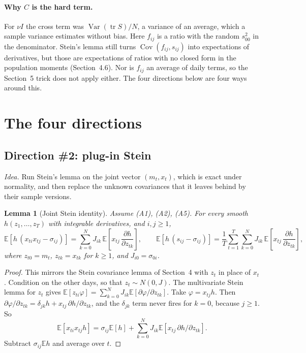 \documentclass[11pt]{article}
\newtheorem{lemma}{Lemma}
\theoremstyle{remark}
\begin{document}
\paragraph{Why $C$ is the hard term.}
For $\nu I$ the cross term was $\operatorname{Var}(\operatorname{tr}S)/N$, a variance of an average, which a sample variance estimates without bias. Here $f_{ij}$ is a ratio with the random $s_{00}^2$ in the denominator. Stein's lemma still turns $\operatorname{Cov}(f_{ij}, s_{ij})$ into expectations of derivatives, but those are expectations of ratios with no closed form in the population moments (Section~4.6). Nor is $f_{ij}$ an average of daily terms, so the Section~5 trick does not apply either. The four directions below are four ways around this.

\section{The four directions}

\subsection{Direction \#2: plug-in Stein}

\emph{Idea.} Run Stein's lemma on the joint vector $(m_t, x_t)$, which is exact under normality, and then replace the unknown covariances that it leaves behind by their sample versions.

\begin{lemma}[Joint Stein identity]\label{lem:joint-stein}
Assume (A1), (A2), (A5). For every smooth $h(z_1, \dots, z_T)$ with integrable derivatives, and $i, j \ge 1$,
\[
  \mathbb{E}\left[h\,(x_{ti}x_{tj} - \sigma_{ij})\right] = \sum_{k=0}^N J_{ik}\,\mathbb{E}\left[x_{tj}\,\frac{\partial h}{\partial z_{tk}}\right],
  \qquad
  \mathbb{E}\left[h\,(s_{ij} - \sigma_{ij})\right] = \frac{1}{T}\sum_{t=1}^T\sum_{k=0}^N J_{ik}\,\mathbb{E}\left[x_{tj}\,\frac{\partial h}{\partial z_{tk}}\right],
\]
where $z_{t0} = m_t$, $z_{tk} = x_{tk}$ for $k \ge 1$, and $J_{i0} = \sigma_{0i}$.
\end{lemma}

\begin{proof}
This mirrors the Stein covariance lemma of Section~4 with $z_t$ in place of $x_t$. Condition on the other days, so that $z_t \sim N(0, J)$. The multivariate Stein lemma for $z_t$ gives $\mathbb{E}[z_{ti}\varphi] = \sum_{k=0}^N J_{ik}\mathbb{E}[\partial\varphi/\partial z_{tk}]$. Take $\varphi = x_{tj}h$. Then $\partial\varphi/\partial z_{tk} = \delta_{jk}h + x_{tj}\,\partial h/\partial z_{tk}$, and the $\delta_{jk}$ term never fires for $k = 0$, because $j \ge 1$. So
\[
  \mathbb{E}[x_{ti}x_{tj}h] = \sigma_{ij}\mathbb{E}[h] + \sum_{k=0}^N J_{ik}\mathbb{E}[x_{tj}\,\partial h/\partial z_{tk}].
\]
Subtract $\sigma_{ij}\mathbb{E}h$ and average over $t$.
\end{proof}
\end{document}
